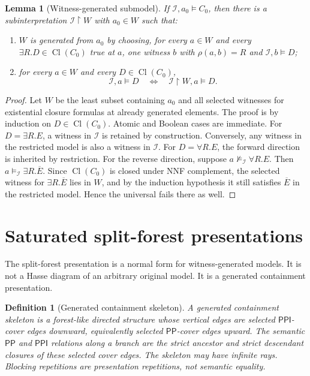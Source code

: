 \documentclass[11pt]{article}
\newtheorem{lemma}[theorem]{Lemma}
\newtheorem{definition}[theorem]{Definition}
\newcommand{\PP}{\mathsf{PP}}
\newcommand{\PPI}{\mathsf{PPI}}
\newcommand{\Cl}{\operatorname{Cl}}
\newcommand{\calI}{\mathcal I}
\begin{document}
\begin{lemma}[Witness-generated submodel]\label{lem:thin}
If $\calI,a_0\models C_0$, then there is a subinterpretation $\calI\upharpoonright W$ with
$a_0\in W$ such that:
\begin{enumerate}[label=(\roman*)]
\item $W$ is generated from $a_0$ by choosing, for every $a\in W$ and every
$\exists R.D\in\Cl(C_0)$ true at $a$, one witness $b$ with $\rho(a,b)=R$ and
$\calI,b\models D$;
\item for every $a\in W$ and every $D\in\Cl(C_0)$,
\[
\calI,a\models D\quad\Longleftrightarrow\quad \calI\upharpoonright W,a\models D .
\]
\end{enumerate}
\end{lemma}

\begin{proof}
Let $W$ be the least subset containing $a_0$ and all selected witnesses for existential
closure formulas at already generated elements.  The proof is by induction on $D\in
\Cl(C_0)$.  Atomic and Boolean cases are immediate.  For $D=\exists R.E$, a witness in
$\calI$ is retained by construction.  Conversely, any witness in the restricted model is
also a witness in $\calI$.  For $D=\forall R.E$, the forward direction is inherited by
restriction.  For the reverse direction, suppose $a\not\models_\calI\forall R.E$.
Then $a\models_\calI\exists R.\overline E$.  Since $\Cl(C_0)$ is closed under NNF
complement, the selected witness for $\exists R.\overline E$ lies in $W$, and by the
induction hypothesis it still satisfies $\overline E$ in the restricted model.  Hence the
universal fails there as well.
\end{proof}

\section{Saturated split-forest presentations}

The split-forest presentation is a normal form for witness-generated models.  It is not a
Hasse diagram of an arbitrary original model.  It is a generated containment presentation.

\begin{definition}[Generated containment skeleton]
A generated containment skeleton is a forest-like directed structure whose vertical edges
are selected $\PPI$-cover edges downward, equivalently selected $\PP$-cover edges upward.
The semantic $\PP$ and $\PPI$ relations along a branch are the strict ancestor and strict
descendant closures of these selected cover edges.  The skeleton may have infinite rays.
Blocking repetitions are presentation repetitions, not semantic equality.
\end{definition}
\end{document}
